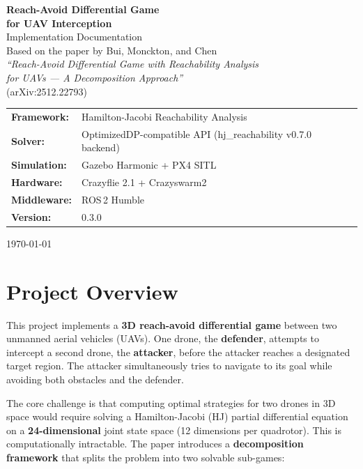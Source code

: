 \documentclass[11pt,a4paper]{article}
\begin{document}
\begin{titlepage}
\centering
\vspace*{3cm}
{\Huge\bfseries Reach-Avoid Differential Game\\[0.3cm] for UAV Interception\\[1cm]}
{\Large Implementation Documentation\\[0.5cm]}
\vspace{1.5cm}
{\large Based on the paper by Bui, Monckton, and Chen\\
\textit{``Reach-Avoid Differential Game with Reachability Analysis\\for UAVs --- A Decomposition Approach''}\\
(arXiv:2512.22793)}
\vspace{2cm}

\begin{tabular}{ll}
\textbf{Framework:} & Hamilton-Jacobi Reachability Analysis\\
\textbf{Solver:} & OptimizedDP-compatible API (hj\_reachability v0.7.0 backend)\\
\textbf{Simulation:} & Gazebo Harmonic + PX4 SITL\\
\textbf{Hardware:} & Crazyflie 2.1 + Crazyswarm2\\
\textbf{Middleware:} & ROS\,2 Humble\\
\textbf{Version:} & 0.3.0\\
\end{tabular}

\vfill
{\large \today}
\end{titlepage}

\tableofcontents
\newpage

\section{Project Overview}

This project implements a \textbf{3D reach-avoid differential game} between two unmanned aerial vehicles (UAVs). One drone, the \textbf{defender}, attempts to intercept a second drone, the \textbf{attacker}, before the attacker reaches a designated target region. The attacker simultaneously tries to navigate to its goal while avoiding both obstacles and the defender.

The core challenge is that computing optimal strategies for two drones in 3D space would require solving a Hamilton-Jacobi (HJ) partial differential equation on a \textbf{24-dimensional} joint state space (12 dimensions per quadrotor). This is computationally intractable. The paper introduces a \textbf{decomposition framework} that splits the problem into two solvable sub-games:
\end{document}
